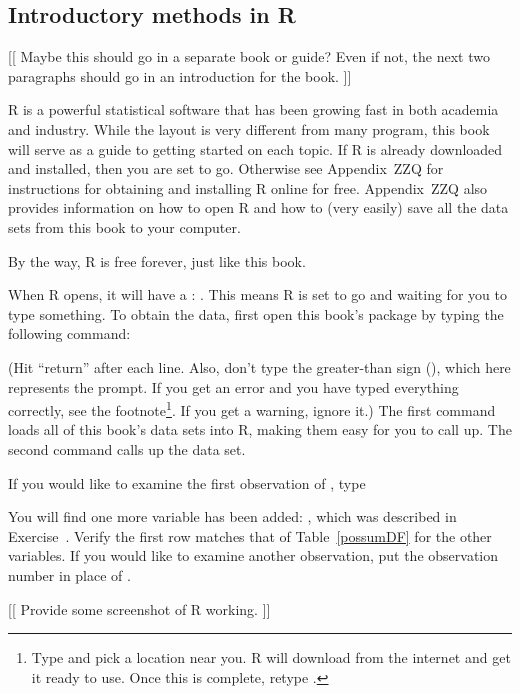\subsection{Introductory methods in R}
\label{introductoryMethodsInR}

[[ Maybe this should go in a separate book or guide? Even if not, the next two paragraphs should go in an introduction for the book. ]]

R is a powerful statistical software that has been growing fast in both academia and industry. While the layout is very different from many program, this book will serve as a guide to getting started on each topic. If R is already downloaded and installed, then you are set to go. Otherwise see Appendix~ZZQ for instructions for obtaining and installing R online for free. Appendix~ZZQ also provides information on how to open R and how to (very easily) save all the data sets from this book to your computer.

By the way, R is free forever, just like this book.

When R opens, it will have a : \rcom{>}. This means R is set to go and waiting for you to type something. To obtain the data, first open this book's package by typing the following command: \\


(Hit ``return'' after each line. Also, don't type the greater-than sign (\rcom{>}), which here represents the prompt. If you get an error and you have typed everything correctly, see the footnote\footnote{Type  and pick a location near you. R will download  from the internet and get it ready to use. Once this is complete, retype .}. If you get a warning, ignore it.) The first command loads all of this book's data sets into R, making them easy for you to call up. The second command calls up the  data set.

If you would like to examine the first observation of , type \\


You will find one more variable has been added: , which was described in Exercise~\exer{}. Verify the first row matches that of Table~\ref{possumDF} for the other variables. If you would like to examine another observation, put the observation number in place of .
\begin{center}
\vspace{1cm}

[[ Provide some screenshot of R working. ]]

\vspace{1cm}
\end{center}


